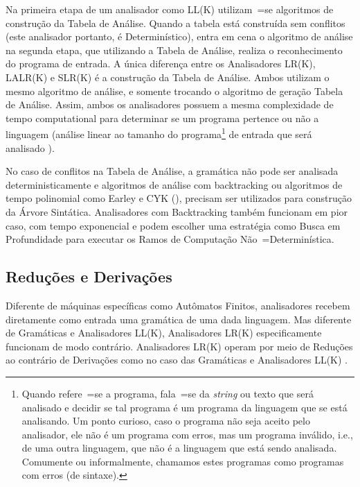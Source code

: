 Na primeira etapa de um analisador como LL(K) utilizam~=se algoritmos de construção da Tabela de Análise.
Quando a tabela está construída sem conflitos (este analisador portanto,
é Determinístico),
entra em cena o algoritmo de análise na segunda etapa,
que utilizando a Tabela de Análise,
realiza o reconhecimento do programa de entrada.
A única diferença entre os Analisadores LR(K),
LALR(K) e
SLR(K) é a construção da Tabela de Análise.
Ambos utilizam o mesmo algoritmo de análise,
e somente trocando o algoritmo de geração Tabela de Análise.
Assim,
ambos os analisadores possuem a mesma complexidade de tempo computational para determinar se um programa pertence ou
não a linguagem (análise linear ao tamanho do programa\footnote{
Quando refere~=se a programa,
fala~=se da \textit{string} ou
texto que será analisado e
decidir se tal programa é um programa da linguagem que se está analisando.
Um ponto curioso,
caso o programa não seja aceito pelo analisador,
ele não é um programa com erros,
mas um programa inválido,
i.e.,
de uma outra linguagem,
que não é a linguagem que está sendo analisada.
Comumente ou
informalmente,
chamamos estes programas como programas com erros (de sintaxe).
}
de entrada que será analisado \cite{knuthLrParser1965,linearLL1AndLR1Grammars,generalContextFreeParsingAlgorithm}).

No caso de conflitos na Tabela de Análise,
a gramática não pode ser analisada deterministicamente e
algoritmos de análise com backtracking ou
algoritmos de tempo polinomial como Earley e
CYK (),
precisam ser utilizados para construção da Árvore Sintática.
%
Analisadores com Backtracking também funcionam em pior caso,
com tempo exponencial e
podem escolher uma estratégia como Busca em Profundidade \cite{cormenIntroductionToAlgorithms} para executar os Ramos de Computação Não~=Determinística.


\subsection{Reduções e Derivações}
\label{section:reducoesEderivacoes}

Diferente de máquinas específicas como Autômatos Finitos,
analisadores recebem diretamente como entrada uma gramática de uma dada linguagem.
Mas diferente de Gramáticas e
Analisadores LL(K),
Analisadores LR(K) especificamente funcionam de modo contrário.
Analisadores LR(K) operam por meio de Reduções ao contrário de Derivações como no caso das Gramáticas e
Analisadores LL(K) \cite{ahoCompilerDragonBook}.

